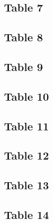\documentclass{article}
\begin{document}
\subsection{Table 7}

\subsection{Table 8}

\subsection{Table 9}

\subsection{Table 10}

\subsection{Table 11}

\subsection{Table 12}

\subsection{Table 13}

\subsection{Table 14}
\end{document}
